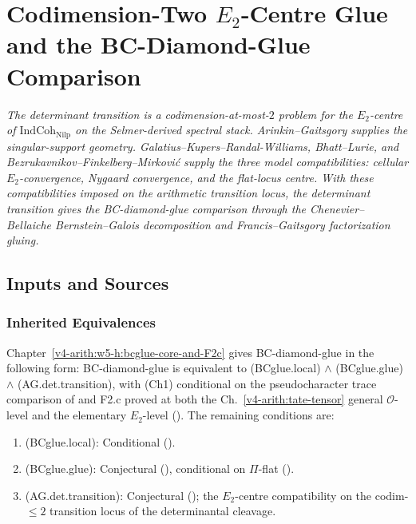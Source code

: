 \chapter{Codimension-Two \(E_{2}\)-Centre Glue and the BC-Diamond-Glue Comparison}
\label{v4-arith:w6-g:chapter}

\emph{The determinant transition is a codimension-at-most-\(2\)
problem for the \(E_{2}\)-centre of
\(\mathrm{IndCoh}_{\mathrm{Nilp}}\) on the Selmer-derived spectral
stack. Arinkin--Gaitsgory supplies the singular-support geometry.
Galatius--Kupers--Randal-Williams, Bhatt--Lurie, and
Bezrukavnikov--Finkelberg--Mirkovi\'c supply the three model
compatibilities: cellular \(E_{2}\)-convergence, Nygaard convergence,
and the flat-locus centre. With these compatibilities imposed on the
arithmetic transition locus, the determinant transition gives the
BC-diamond-glue comparison through the Chenevier--Bellaiche
Bernstein--Galois decomposition and Francis--Gaitsgory factorization
gluing.}

\section{Inputs and Sources}
\label{v4-arith:w6-g:domain}

\subsection{Inherited Equivalences}

Chapter~\ref{v4-arith:w5-h:bcglue-core-and-F2c} gives
BC-diamond-glue in the following form: BC-diamond-glue is
equivalent to (BCglue.local) \(\wedge\) (BCglue.glue) \(\wedge\)
(AG.det.transition), with (Ch1) conditional on the pseudocharacter
trace comparison of
 and F2.c
proved at both the Ch.~\ref{v4-arith:tate-tensor}
general \(\mathcal{O}\)-level and the elementary \(E_{2}\)-level
(). The remaining
conditions are:
\begin{enumerate}
\item (BCglue.local): Conditional
().
\item (BCglue.glue): Conjectural
(), conditional on
\(\Pi\)-flat ().
\item (AG.det.transition): Conjectural
(); the \(E_{2}\)-centre
compatibility on the codim-\(\leq 2\) transition locus of the
determinantal cleavage.
\end{enumerate}


